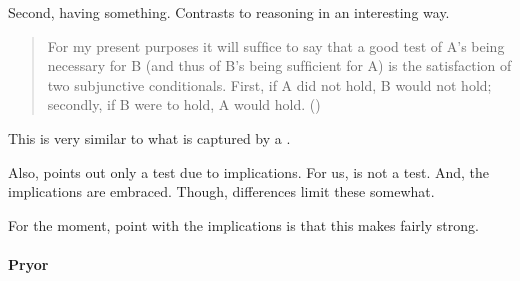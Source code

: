 \begin{note}
  Second, having something.
  Contrasts to reasoning in an interesting way.
\end{note}

\begin{note}

  \begin{quote}
    For my present purposes it will sufﬁce to say that a good test of A’s being necessary for B (and thus of B’s being sufﬁcient for A) is the satisfaction of two subjunctive conditionals. First, if A did not hold, B would not hold; secondly, if B were to hold, A would hold.%
    \mbox{}\hfill\mbox{(\citeyear[761]{Sgaravatti:2013wu})}
  \end{quote}
  This is very similar to what is captured by a \requ{}.

  Also, points out only a test due to implications.
  For us, \requ{} is not a test.
  And, the implications are embraced.
  Though, differences limit these somewhat.

  For the moment, point with the implications is that this makes \zS{} fairly strong.
\end{note}

\paragraph{Pryor}

